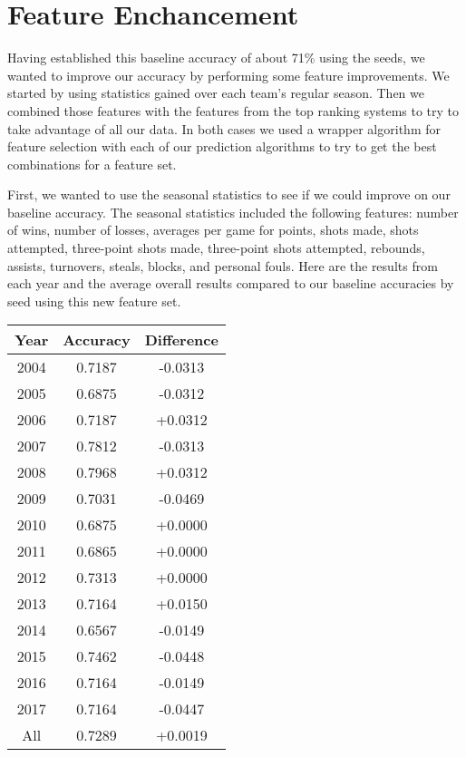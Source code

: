 \section{Feature Enchancement}
Having established this baseline accuracy of about 71\% using the seeds, we wanted to improve our accuracy by performing some feature improvements. 
We started by using statistics gained over each team’s regular season. 
Then we combined those features with the features from the top ranking systems to try to take advantage of all our data. 
In both cases we used a wrapper algorithm for feature selection with each of our prediction algorithms to try to get the best combinations for a feature set.

First, we wanted to use the seasonal statistics to see if we could improve on our baseline accuracy.
The seasonal statistics included the following features: number of wins, number of losses, averages per game for points, shots made, shots attempted, three-point shots made, three-point shots attempted, rebounds, assists, turnovers, steals, blocks, and personal fouls.
Here are the results from each year and the average overall results compared to our baseline accuracies by seed using this new feature set. 

\vspace{0.5cm}
\begin{tabular}{c c c}
    \toprule
    Year & Accuracy & Difference\\
    \midrule
    2004 & 0.7187 & -0.0313\\
    2005 & 0.6875 & -0.0312\\
    2006 & 0.7187 & +0.0312\\
    2007 & 0.7812 & -0.0313\\
    2008 & 0.7968 & +0.0312\\
    2009 & 0.7031 & -0.0469\\
    2010 & 0.6875 & +0.0000\\
    2011 & 0.6865 & +0.0000\\
    2012 & 0.7313 & +0.0000\\
    2013 & 0.7164 & +0.0150\\
    2014 & 0.6567 & -0.0149\\
    2015 & 0.7462 & -0.0448\\
    2016 & 0.7164 & -0.0149\\
    2017 & 0.7164 & -0.0447\\
    All & 0.7289 & +0.0019\\
    \bottomrule
\end{tabular}
\vspace{0.5cm}

